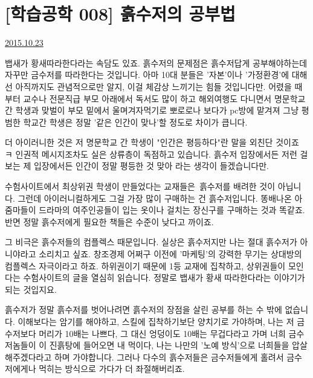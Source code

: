 \section{[학습공학 008] 흙수저의 공부법}
\href{https://www.kockoc.com/Apoc/437242}{2015.10.23}

\vspace{5mm}

뱁새가 황새따라한다라는 속담도 있죠.
흙수저의 문제점은 흙수저답게 공부해야하는데 자꾸만 금수저를 따라한다는 것입니다.
아마 10대 분들은 '자본'이나 '가정환경'에 대해선 아직까지도 관념적으로만 알지, 이걸 체감상 느끼기는 힘들 것입니다만.
어렸을 때부터 교수나 전문직급 부모 아래에서 독서도 많이 하고 해외여행도 다니면서 명문학교 간 학생과
맞벌이 부모 밑에서 울며겨자먹기로 뽀로로나 보다가 pc방에 맡겨져 그냥 평범한 학교간 학생은 정말 '같은 인간이 맞나'할 정도로 차이가 큽니다.
\vspace{5mm}

더 아이러니한 것은 저 명문학교 간 학생이 "인간은 평등하다"란 말을 외친단 것이죠 ㅋ
인권적 메시지조차도 실은 상류층이 독점하고 있습니다.
흙수저 입장에서든 저런 걸 보는 제 입장에서든 인간이 정말 평등한 것 맞아 라는 생각이 들겠습니다만.
\vspace{5mm}

수험사이트에서 최상위권 학생이 만들었다는 교재들은 흙수저를 배려한 것이 아닙니다.
그런데 아이러니컬하게도 그걸 가장 많이 구매하는 건 흙수저입니다.
똥배나온 아줌마들이 드라마의 여주인공들이 입는 옷이나 걸치는 장신구를 구매하는 것과 똑같죠.
반면 정말 흙수저에게 필요한 책들은 수준이 낮다고 까이죠.
\vspace{5mm}

그 비극은 흙수저들의 컴플렉스 때문입니다.
실상은 흙수저지만 나는 절대 흙수저가 아니야라고 소리치고 싶죠.
창조경제 어쩌구 이전에 '마케팅'의 강력한 무기는 상대방의 컴플렉스 자극이라고 하죠.
하위권이기 때문에 1등 교재에 집착하고, 상위권들이 모인다는 수험사이트의 글을 열심히 읽습니다.
정말로 뱁새가 황새 따라한다라는 이야기가 되는 것입지요.
\vspace{5mm}

흙수저가 정말 흙수저를 벗어나려면 흙수저의 장점을 살린 공부를 하는 수 밖에 없습니다.
이해보다는 암기를 해야하고, 스킬에 집착하기보단 양치기로 가야하며,
나는 저 금수저보다 머리가 10배는 나쁘다, 그 대신 엉덩이도 10배는 무겁다라고 가며
너희 금수저놈들이 이 진흙탕에 들어오면 내 먹이다, 나는 나만의 '노예 방식'으로 너희들을 압살해주겠다라고 하며 가야합니다.
그러나 다수의 흙수저들은 금수저들에게 홀려서 금수저에게나 먹히는 방식으로 가다가 더 좌절해버리죠.
\vspace{5mm}

